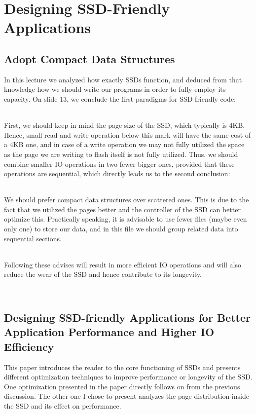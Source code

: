 \documentclass[../../main.tex]{subfiles}
\begin{document}
\section{Designing SSD-Friendly Applications}
\subsection{Adopt Compact Data Structures}
In this lecture we analyzed how exactly SSDs function, and deduced from that knowledge how we should write our programs in order to fully employ its capacity. On slide 13, we conclude the first paradigms for SSD friendly code:

~\\
First, we should keep in mind the page size of the SSD, which typically is 4KB. Hence, small read and write operation below this mark will have the same cost of a 4KB one, and in case of a write operation we may not fully utilized the space as the page we are writing to flash itself is not fully utilized. Thus, we should combine smaller IO operations in two fewer bigger ones, provided that these operations are sequential, which directly leads us to the second conclusion:

~\\
We should prefer compact data structures over scattered ones. This is due to the fact that we utilized the pages better and the controller of the SSD can better optimize this. Practically speaking, it is advisable to use fewer files (maybe even only one) to store our data, and in this file we should group related data into sequential sections.

~\\
Following these advises will result in more efficient IO operations and will also reduce the wear of the SSD and hence contribute to its longevity.


~\\
\subsection{Designing SSD-friendly Applications for Better Application Performance and Higher IO Efficiency}
This paper introduces the reader to the core functioning of SSDs and presents different optimization techniques to improve performance or longevity of the SSD. One optimization presented in the paper directly follows on from the previous discussion. The other one I chose to present analyzes the page distribution inside the SSD and its effect on performance.
\end{document}
